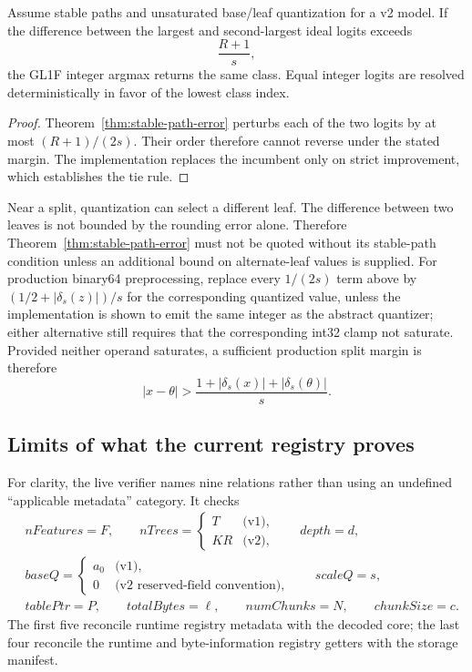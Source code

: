 \begin{corollary}
\label{cor:argmax}
Assume stable paths and unsaturated base/leaf quantization for a v2 model.  If
the difference between the largest and second-largest ideal logits exceeds
\[
 \frac{R+1}{s},
\]
the GL1F integer argmax returns the same class.  Equal integer logits are
resolved deterministically in favor of the lowest class index.
\end{corollary}

\begin{proof}
Theorem~\ref{thm:stable-path-error} perturbs each of the two logits by at most
$(R+1)/(2s)$.  Their order therefore cannot reverse under the stated margin.
The implementation replaces the incumbent only on strict improvement, which
establishes the tie rule.
\end{proof}

\begin{remark}
Near a split, quantization can select a different leaf.  The difference
between two leaves is not bounded by the rounding error alone.  Therefore
Theorem~\ref{thm:stable-path-error} must not be quoted without its stable-path
condition unless an additional bound on alternate-leaf values is supplied.
For production binary64 preprocessing, replace every $1/(2s)$ term above by
$(1/2+|\delta_s(z)|)/s$ for the corresponding quantized value, unless the
implementation is shown to emit the same integer as the abstract quantizer;
either alternative still requires that the corresponding int32 clamp not
saturate.  Provided neither operand saturates, a sufficient production split
margin is therefore
\[
 |x-\theta|>
 \frac{1+|\delta_s(x)|+|\delta_s(\theta)|}{s}.
\]
\end{remark}

\subsection{Limits of what the current registry proves}

For clarity, the live verifier names nine relations rather than using an
undefined ``applicable metadata'' category.  It checks
\[
\begin{split}
 &nFeatures=F,\qquad
 nTrees=\begin{cases}T&\text{(v1)},\\KR&\text{(v2)},\end{cases}
 \qquad depth=d,\\
 &baseQ=\begin{cases}a_0&\text{(v1)},\\0&\text{(v2 reserved-field convention)},\end{cases}
 \qquad scaleQ=s,\\
 &tablePtr=P,\qquad totalBytes=\ell,\qquad
 numChunks=N,\qquad chunkSize=c.
\end{split}
\]
The first five reconcile runtime registry metadata with the decoded core; the
last four reconcile the runtime and byte-information registry getters with
the storage manifest.

